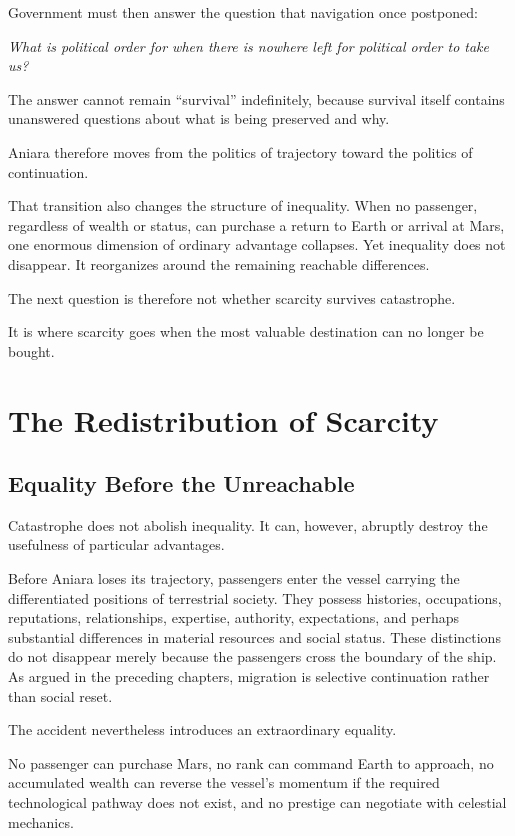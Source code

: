 \documentclass[11pt,oneside]{book}
\theoremstyle{definition}
\theoremstyle{remark}
\begin{document}
Government must then answer the question that navigation once postponed:

\begin{center}
\emph{What is political order for when there is nowhere left for political order to take us?}
\end{center}

The answer cannot remain ``survival'' indefinitely, because survival itself contains unanswered questions about what is being preserved and why.

Aniara therefore moves from the politics of trajectory toward the politics of continuation.

That transition also changes the structure of inequality. When no passenger, regardless of wealth or status, can purchase a return to Earth or arrival at Mars, one enormous dimension of ordinary advantage collapses. Yet inequality does not disappear. It reorganizes around the remaining reachable differences.

The next question is therefore not whether scarcity survives catastrophe.

It is where scarcity goes when the most valuable destination can no longer be bought.

\chapter{The Redistribution of Scarcity}

\section{Equality Before the Unreachable}

Catastrophe does not abolish inequality. It can, however, abruptly destroy the usefulness of particular advantages.

Before Aniara loses its trajectory, passengers enter the vessel carrying the differentiated positions of terrestrial society. They possess histories, occupations, reputations, relationships, expertise, authority, expectations, and perhaps substantial differences in material resources and social status. These distinctions do not disappear merely because the passengers cross the boundary of the ship. As argued in the preceding chapters, migration is selective continuation rather than social reset.

The accident nevertheless introduces an extraordinary equality.

No passenger can purchase Mars, no rank can command Earth to approach, no accumulated wealth can reverse the vessel's momentum if the required technological pathway does not exist, and no prestige can negotiate with celestial mechanics.
\end{document}
